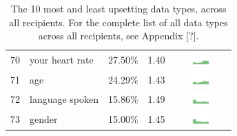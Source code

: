 \begin{table}[t]
\begin{center}
\begin{tabular}{| r | l | r | r |c |}
70 & your heart rate & 27.50\% & 1.40 & \includegraphics[width = 2cm, height = 0.5cm]{tex-inputs/data10/learnedyourheartratecombined} \\
71 & age & 24.29\% & 1.43 & \includegraphics[width = 2cm, height = 0.5cm]{tex-inputs/data10/learnedyouragecombined}\\
72 & language spoken & 15.86\% & 1.49 & \includegraphics[width = 2cm, height = 0.5cm]{tex-inputs/data10/learnedthelanguageyouwerespeakingcombined}\\
73 & gender & 15.00\% & 1.45 & \includegraphics[width = 2cm, height = 0.5cm]{tex-inputs/data10/learnedyourgendercombined}\\ 
\hline
\end{tabular}
\caption{The 10 most and least upsetting data types, across all recipients. For the complete list of all data types across all recipients, see Appendix [?].}
\label{top10-table}
\end{center}
\end{table}











